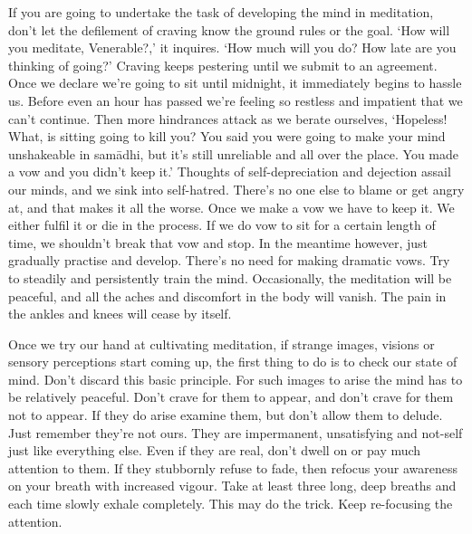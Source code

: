 If you are going to undertake the task of developing the mind in meditation, don't let the defilement of craving know the ground rules or the goal. `How will you meditate, Venerable?,' it inquires. `How much will you do? How late are you thinking of going?' Craving keeps pestering until we submit to an agreement. Once we declare we're going to sit until midnight, it immediately begins to hassle us. Before even an hour has passed we're feeling so restless and impatient that we can't continue. Then more hindrances attack as we berate ourselves, `Hopeless! What, is sitting going to kill you? You said you were going to make your mind unshakeable in sam\=adhi, but it's still unreliable and all over the place. You made a vow and you didn't keep it.' Thoughts of self-depreciation and dejection assail our minds, and we sink into self-hatred. There's no one else to blame or get angry at, and that makes it all the worse. Once we make a vow we have to keep it. We either fulfil it or die in the process. If we do vow to sit for a certain length of time, we shouldn't break that vow and stop. In the meantime however, just gradually practise and develop. There's no need for making dramatic vows. Try to steadily and persistently train the mind. Occasionally, the meditation will be peaceful, and all the aches and discomfort in the body will vanish. The pain in the ankles and knees will cease by itself.

Once we try our hand at cultivating meditation, if strange images, visions or sensory perceptions start coming up, the first thing to do is to check our state of mind. Don't discard this basic principle. For such images to arise the mind has to be relatively peaceful. Don't crave for them to appear, and don't crave for them not to appear. If they do arise examine them, but don't allow them to delude. Just remember they're not ours. They are impermanent, unsatisfying and not-self just like everything else. Even if they are real, don't dwell on or pay much attention to them. If they stubbornly refuse to fade, then refocus your awareness on your breath with increased vigour. Take at least three long, deep breaths and each time slowly exhale completely. This may do the trick. Keep re-focusing the attention.

